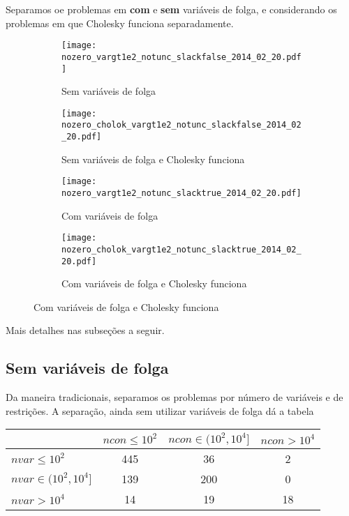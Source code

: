 \documentclass{article}
\renewcommand{\emph}[1]{\textbf{#1}}
\begin{document}
Separamos oe problemas em \emph{com} e \emph{sem} variáveis de folga, e
considerando os problemas em que Cholesky funciona separadamente.
\begin{figure}[H]
  \centering
  \begin{subfigure}{0.48\textwidth}
    \texttt{[image: nozero\_vargt1e2\_notunc\_slackfalse\_2014\_02\_20.pdf]}
    \caption{Sem variáveis de folga}
  \end{subfigure}
  \begin{subfigure}{0.48\textwidth}
    \texttt{[image: nozero\_cholok\_vargt1e2\_notunc\_slackfalse\_2014\_02\_20.pdf]}
    \caption{Sem variáveis de folga e Cholesky funciona}
  \end{subfigure}
  \begin{subfigure}{0.48\textwidth}
    \texttt{[image: nozero\_vargt1e2\_notunc\_slacktrue\_2014\_02\_20.pdf]}
    \caption{Com variáveis de folga}
  \end{subfigure}
  \begin{subfigure}{0.48\textwidth}
    \texttt{[image: nozero\_cholok\_vargt1e2\_notunc\_slacktrue\_2014\_02\_20.pdf]}
    \caption{Com variáveis de folga e Cholesky funciona}
  \end{subfigure}
\end{figure}

Mais detalhes nas subseções a seguir.

\newpage
\subsection{Sem variáveis de folga}

Da maneira tradicionais, separamos os problemas por número de variáveis e de
restrições. A separação, ainda sem utilizar variáveis de folga dá a tabela
\begin{center}
\begin{tabular}{|l|c|c|c|} \hline
& $ncon \leq 10^2$ & $ncon \in (10^2,10^4]$ & $ncon > 10^4$ \\ \hline
$nvar \leq 10^2$       & 445 &  36 &  2 \\ \hline
$nvar \in (10^2,10^4]$ & 139 & 200 &  0 \\ \hline
$nvar > 10^4$          &  14 &  19 & 18 \\ \hline
\end{tabular}
\end{center}
\end{document}

